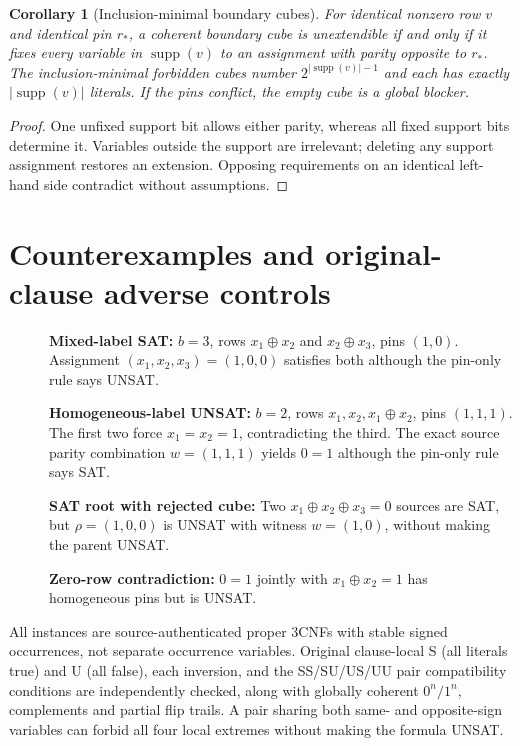 \documentclass[11pt]{article}
\newtheorem{corollary}{Corollary}
\begin{document}
\begin{corollary}[Inclusion-minimal boundary cubes]
For identical nonzero row $v$ and identical pin $r_*$, a coherent boundary cube is unextendible if and only if it fixes \emph{every} variable in $\operatorname{supp}(v)$ to an assignment with parity opposite to $r_*$. The inclusion-minimal forbidden cubes number $2^{|\operatorname{supp}(v)|-1}$ and each has exactly $|\operatorname{supp}(v)|$ literals. If the pins conflict, the empty cube is a global blocker.
\end{corollary}
\begin{proof}
One unfixed support bit allows either parity, whereas all fixed support bits determine it. Variables outside the support are irrelevant; deleting any support assignment restores an extension. Opposing requirements on an identical left-hand side contradict without assumptions.
\end{proof}

\section{Counterexamples and original-clause adverse controls}
\begin{description}
\item[] \textbf{Mixed-label SAT:} $b=3$, rows $x_1\oplus x_2$ and $x_2\oplus x_3$, pins $(1,0)$. Assignment $(x_1,x_2,x_3)=(1,0,0)$ satisfies both although the pin-only rule says UNSAT.
\item[] \textbf{Homogeneous-label UNSAT:} $b=2$, rows $x_1,x_2,x_1\oplus x_2$, pins $(1,1,1)$. The first two force $x_1=x_2=1$, contradicting the third. The exact source parity combination $w=(1,1,1)$ yields $0=1$ although the pin-only rule says SAT.
\item[] \textbf{SAT root with rejected cube:} Two $x_1\oplus x_2\oplus x_3=0$ sources are SAT, but $\rho=(1,0,0)$ is UNSAT with witness $w=(1,0)$, without making the parent UNSAT.
\item[] \textbf{Zero-row contradiction:} $0=1$ jointly with $x_1\oplus x_2=1$ has homogeneous pins but is UNSAT.
\end{description}
All instances are source-authenticated proper 3CNFs with stable signed occurrences, not separate occurrence variables. Original clause-local S (all literals true) and U (all false), each inversion, and the SS/SU/US/UU pair compatibility conditions are independently checked, along with globally coherent $0^n/1^n$, complements and partial flip trails. A pair sharing both same- and opposite-sign variables can forbid all four local extremes without making the formula UNSAT.
\end{document}
